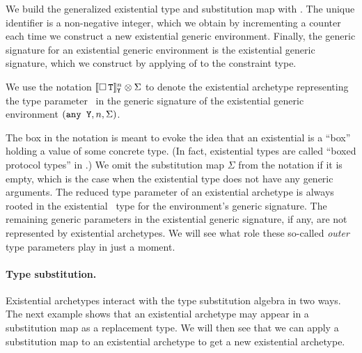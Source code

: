 \documentclass[../generics]{subfiles}
\begin{document}
We build the generalized existential type and substitution map with . The unique identifier is a non-negative integer, which we obtain by incrementing a counter each time we construct a new existential generic environment. Finally, the generic signature for an existential generic environment is the existential generic signature, which we construct by applying of  to the constraint type.

\begin{definition}
We use the notation $[\![\Box\,\texttt{T}]\!]^n_{\texttt{Y}} \otimes \Sigma$ to denote the existential archetype representing the type parameter \tT\ in the generic signature of the existential generic environment $(\texttt{any~Y},n,\Sigma)$.
\end{definition}

The box in the notation is meant to evoke the idea that an existential is a ``box'' holding a value of some concrete type. (In fact, existential types are called ``boxed protocol types'' in \cite{tspl}.) We omit the substitution map $\Sigma$ from the notation if it is empty, which is the case when the existential type does not have any generic arguments. The reduced type parameter of an existential archetype is always rooted in the existential \tSelf\ type for the environment's generic signature. The remaining generic parameters in the existential generic signature, if any, are not represented by existential archetypes. We will see what role these so-called \emph{outer} type parameters play in just a moment.

\paragraph{Type substitution.}
Existential archetypes interact with the type substitution algebra in two ways. The next example shows that an existential archetype may appear in a substitution map as a replacement type. We will then see that we can apply a substitution map to an existential archetype to get a new existential archetype.
\end{document}
